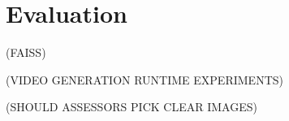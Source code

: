 \documentclass{l4proj}
\begin{document}




\chapter{Evaluation} 
(FAISS)

(VIDEO GENERATION RUNTIME EXPERIMENTS)

(SHOULD ASSESSORS PICK CLEAR IMAGES)






\end{document}
